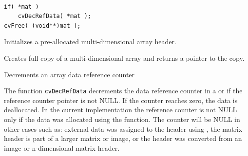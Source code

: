 \begin{lstlisting}

if( *mat )
    cvDecRefData( *mat );
cvFree( (void**)mat );

\end{lstlisting}

\label{InitMatNDHeader}

Initializes a pre-allocated multi-dimensional array header.


\begin{description}
\end{description}

\label{CloneMatND}

Creates full copy of a multi-dimensional array and returns a pointer to the copy.


\begin{description}
\end{description}


\label{DecRefData}

Decrements an array data reference counter


\begin{description}
\end{description}

The function \texttt{cvDecRefData} decrements the data reference counter in a  or
 if the reference counter pointer
is not NULL. If the counter reaches zero, the data is deallocated. In the
current implementation the reference counter is not NULL only if the data
was allocated using the  function. The counter will be NULL in other cases such as:
external data was assigned to the header using , the matrix
header is part of a larger matrix or image, or the header was converted from an image or n-dimensional matrix header. 


